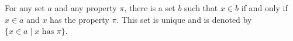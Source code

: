 For any set $a$ and any property $\pi$, there is a set $b$ such that $x \in b$ if and only if $x \in a$ and $x$ has the property $\pi$. This set is unique and is denoted by $\{x \in a \mid x \text{ has } \pi\}$.
